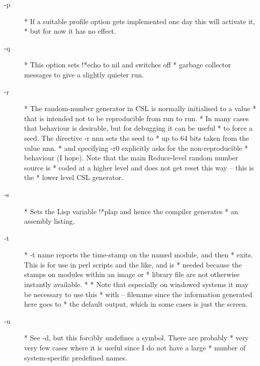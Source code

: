 \documentclass[a4paper,11pt]{article}
\begin{document}
\begin{description}
\item [{\ttfamily -p}] 
          * If a suitable profile option gets implemented one day this will activate it,
          * but for now it has no effect.

\item [{\ttfamily -q}] 
          * This option sets {\ttfamily !*echo} to {\ttfamily nil} and switches off
          * garbage collector messages to give a slightly quieter run.

\item [{\ttfamily -r}] 
          * The random-number generator in CSL is normally initialised to a value
          * that is intended not to be reproducible from run to run.
          * In many cases that behaviour is desirable, but for debugging it can be useful
          * to force a seed. The directive {\ttfamily -r nnn} sets the seed to
          * up to 64 bits taken from the value nnn.
          * and specifying {\ttfamily -r0}  explicitly asks for the non-reproducible
          * behaviour (I hope). Note that the main Reduce-level random number source is
          * coded at a higher level and does not get reset this way -- this is the
          * lower level CSL generator.

\item [{\ttfamily -s}] 
          * Sets the Lisp variable {\ttfamily !*plap} and hence the compiler generates
          * an assembly listing.

\item [{\ttfamily -t}] 
          * {\ttfamily -t name} reports the time-stamp on the named module, and then
          * exits. This is for use in perl scripts and the like, and is
          * needed because the stamps on modules within an image or
          * library file are not otherwise instantly available.
          *
          * Note that especially on windowed systems it may be necessary to use this
          * with {\ttfamily -- filename} since the information generated here goes to
          * the default output, which in some cases is just the screen.

\item [{\ttfamily -u}] 
          * See {\ttfamily -d}, but this forcibly undefines a symbol. There are probably
          * very very few cases where it is useful since I do not have a large
          * number of system-specific predefined names.


\end{description}
\end{document}
